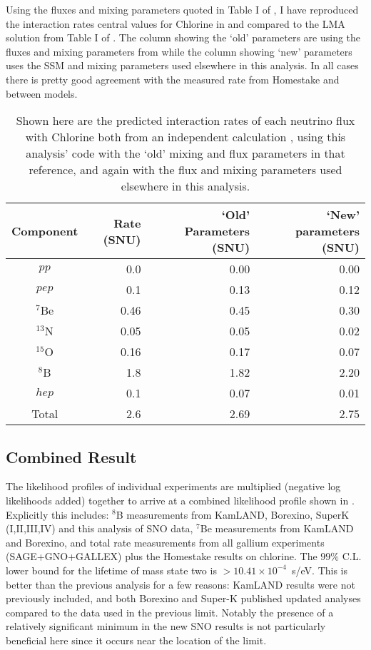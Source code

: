 Using the fluxes and mixing parameters quoted in Table I of \cite{bachall_lma}, I have reproduced the interaction rates central values for Chlorine in  and compared to the LMA solution from Table I of \cite{bachall_lma}.
The column showing the `old' parameters are using the fluxes and mixing parameters from \cite{bachall_lma} while the column showing `new' parameters uses the SSM and mixing parameters used elsewhere in this analysis.
In all cases there is pretty good agreement with the measured rate from Homestake and between models.

\begin{table}
\centering
\begin{tabular}{c|r|r|r}
Component & \cite{bachall_lma} Rate (SNU) & `Old' Parameters (SNU) & `New' parameters (SNU) \\ \hline
$pp$		& 0.0	&	0.00 & 0.00		\\
$pep$		& 0.1 	&	0.13 & 0.12		\\ 
$^7$Be		& 0.46	&	0.45 & 0.30		\\
$^{13}$N	& 0.05 	&	0.05 & 0.02		\\ 
$^{15}$O	& 0.16 	&	0.17 & 0.07		\\ 
$^8$B		& 1.8 	&	1.82 & 2.20		\\ 
$hep$		& 0.1 	&	0.07 & 0.01		\\ \hline
Total		& 2.6	&	2.69 & 2.75		\\ \hline
\end{tabular}
\caption{\label{tbl:chlorine}Shown here are the predicted interaction rates of each neutrino flux with Chlorine both from an independent calculation \cite{bachall_lma}, using this analysis' code with the `old' mixing and flux parameters in that reference, and again with the flux and mixing parameters used elsewhere in this analysis.}
\end{table}

\subsection{Combined Result}
\label{sec:combobreaker}

The likelihood profiles of individual experiments are multiplied (negative log likelihoods added) together to arrive at a combined likelihood profile shown in . 
Explicitly this includes: $^8$B measurements from KamLAND, Borexino, SuperK (I,II,III,IV) and this analysis of SNO data, $^7$Be measurements from KamLAND and Borexino, and total rate measurements from all gallium experiments (SAGE+GNO+GALLEX) plus the Homestake results on chlorine. 
The $99\%$ C.L. lower bound for the lifetime of mass state two is $>10.41\times10^{-4}$~s/eV. 
This is better than the previous analysis for a few reasons: KamLAND results were not previously included, and both Borexino and Super-K published updated analyses compared to the data used in the previous limit. 
Notably the presence of a relatively significant minimum in the new SNO results is not particularly beneficial here since it occurs near the location of the limit.

